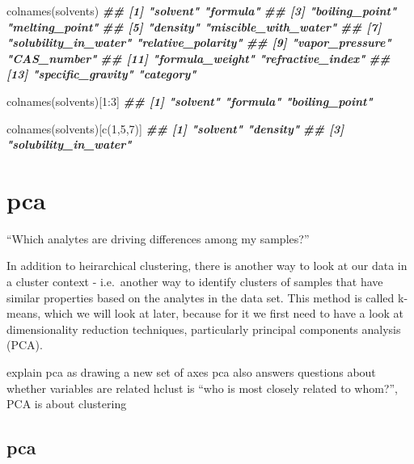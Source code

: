 \documentclass[
]{krantz}
\newenvironment{Shaded}{\begin{snugshade}}{\end{snugshade}}
\newcommand{\DecValTok}[1]{\textcolor[rgb]{0.00,0.00,0.81}{#1}}
\newcommand{\DocumentationTok}[1]{\textcolor[rgb]{0.56,0.35,0.01}{\textbf{\textit{#1}}}}
\newcommand{\FunctionTok}[1]{\textcolor[rgb]{0.00,0.00,0.00}{#1}}
\newcommand{\NormalTok}[1]{#1}
\newcommand{\SpecialCharTok}[1]{\textcolor[rgb]{0.00,0.00,0.00}{#1}}
\begin{document}
\begin{Shaded}
\begin{Highlighting}[]
\FunctionTok{colnames}\NormalTok{(solvents)}
\DocumentationTok{\#\#  [1] "solvent"             "formula"            }
\DocumentationTok{\#\#  [3] "boiling\_point"       "melting\_point"      }
\DocumentationTok{\#\#  [5] "density"             "miscible\_with\_water"}
\DocumentationTok{\#\#  [7] "solubility\_in\_water" "relative\_polarity"  }
\DocumentationTok{\#\#  [9] "vapor\_pressure"      "CAS\_number"         }
\DocumentationTok{\#\# [11] "formula\_weight"      "refractive\_index"   }
\DocumentationTok{\#\# [13] "specific\_gravity"    "category"}

\FunctionTok{colnames}\NormalTok{(solvents)[}\DecValTok{1}\SpecialCharTok{:}\DecValTok{3}\NormalTok{]}
\DocumentationTok{\#\# [1] "solvent"       "formula"       "boiling\_point"}

\FunctionTok{colnames}\NormalTok{(solvents)[}\FunctionTok{c}\NormalTok{(}\DecValTok{1}\NormalTok{,}\DecValTok{5}\NormalTok{,}\DecValTok{7}\NormalTok{)]}
\DocumentationTok{\#\# [1] "solvent"             "density"            }
\DocumentationTok{\#\# [3] "solubility\_in\_water"}
\end{Highlighting}
\end{Shaded}

\hypertarget{PCA}{%
\section{pca}\label{PCA}}

``Which analytes are driving differences among my samples?''

In addition to heirarchical clustering, there is another way to look at our data in a cluster context - i.e.~another way to identify clusters of samples that have similar properties based on the analytes in the data set. This method is called k-means, which we will look at later, because for it we first need to have a look at dimensionality reduction techniques, particularly principal components analysis (PCA).

explain pca as drawing a new set of axes
pca also answers questions about whether variables are related
hclust is ``who is most closely related to whom?'', PCA is about clustering

\hypertarget{pca}{%
\subsection{pca}\label{pca}}
\end{document}
